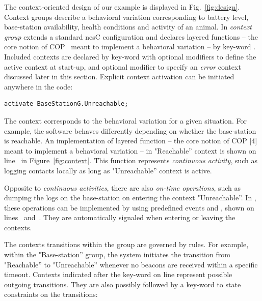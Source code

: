 The context-oriented design of our example is displayed in
Fig.~\ref{fig:design}. Context groups describe a behavioral variation
corresponding to battery level, base-station availability, health conditions and
activity of an animal. In \conesc \emph{context group} extends a standard nesC
configuration and declares layered functions -- the core notion of
COP~\cite{Hirschfeld08} meant to implement a behavioral variation -- by key-word
. Included contexts are declared by key-word  with
optional modifiers  to define the active context at start-up,
and optional modifier  to specify an \emph{error} context
discussed later in this section. Explicit context activation can be initiated
anywhere in the code:

\vspace{-1mm}
\begin{lstlisting}[language=conesc]
activate BaseStationG.Unreachable;
\end{lstlisting}
\vspace{-1.5mm}

The context corresponds to the behavioral variation for a given situation. For
example, the software behaves differently depending on whether the base-station
is reachable. An implementation of layered function -- the core notion of COP
[4] meant to implement a behavioral variation -- in "Reachable'' context is
shown on line~ in Figure~\ref{fig:context}. This function
represents \emph{continuous activity}, such as logging contacts locally as long
as "Unreachable'' context is active.

Opposite to \emph{continuous activities}, there are also \emph{on-time
operations}, such as dumping the logs on the base-station on entering the
context "Unreachable''. In \conesc, these operations can be implemented by using
predefined events  and , shown on
lines~ and~. They are automatically
signaled when entering or leaving the contexts.

The contexts transitions within the group are governed by rules. For example,
within the "Base-station'' group, the system initiates the transition from
"Reachable'' to "Unreachable'' whenever no beacons are received within a
specific timeout. Contexts indicated after the key-word  on
line  represent possible outgoing transitions. They are also
possibly followed by a key-word  to state constraints on the
transitions:

